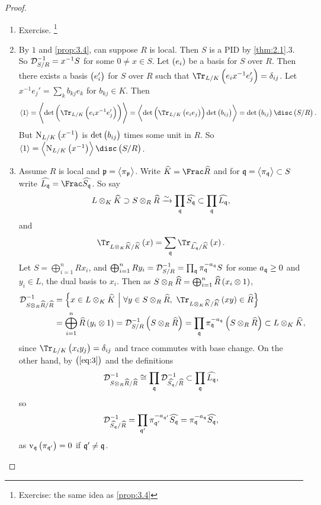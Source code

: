 \begin{proof}
\hfill
\begin{enumerate}
\item Exercise. \footnote{Exercise: the same idea as \ref{prop:3.4}}
\item By $ 1 $ and \ref{prop:3.4}, can suppose $ R $ is local. Then $ S $ is a PID by \ref{thm:2.1}.$ 3 $. So $ \mathcal{D}_{S / R}^{-1} = x^{-1}S $ for some $ 0 \ne x \in S $. Let $ \br{e_i} $ be a basis for $ S $ over $ R $. Then there exists a basis $ \br{e_i'} $ for $ S $ over $ R $ such that $ \Tr_{L / K}\br{e_ix^{-1}e_j'} = \delta_{ij} $. Let $ x^{-1}e_j' = \sum_k b_{kj}e_k $ for $ b_{kj} \in K $. Then
$$ \abr{1} = \abr{\det \br{\Tr_{L / K}\br{e_ix^{-1}e_j'}}} = \abr{\det \br{\Tr_{L / K}\br{e_ie_j}}\det \br{b_{ij}}} = \det \br{b_{ij}}\disc\br{S / R}. $$
But $ \N_{L / K}\br{x^{-1}} $ is $ \det \br{b_{ij}} $ times some unit in $ R $. So $ \abr{1} = \abr{\N_{L / K}\br{x^{-1}}}\disc\br{S / R} $.


\item Assume $ R $ is local and $ \mathfrak{p} = \left\langle \pi_{\mathfrak{p}} \right\rangle $. Write $ \widehat{K} = \Frac \widehat{R} $ and for $ \mathfrak{q} = \left\langle \pi_{\mathfrak{q}} \right\rangle \subset S $ write $ \widehat{L_\qqq} = \Frac \widehat{S_\qqq} $. So say
$$ L \otimes_K \widehat{K} \supset S \otimes_R \widehat{R} \xrightarrow{\sim} \prod_{\mathfrak{q}} \widehat{S_{\mathfrak{q}}} \subset \prod_{\mathfrak{q}} \widehat{L_{\mathfrak{q}}}, $$
and
\begin{equation}
\label{eq:3}
\Tr_{L \otimes_K \widehat{K} / \widehat{K}}\br{x} = \sum_\qqq \Tr_{\widehat{L_\qqq} / \widehat{K}}\br{x}.
\end{equation}
Let $ S = \bigoplus_{i = 1}^n Rx_i $, and $ \bigoplus_{i = 1}^n Ry_i = \mathcal{D}_{S / R}^{-1} = \prod_{\mathfrak{q}} \pi_{\mathfrak{q}}^{-a_{\mathfrak{q}}}S $ for some $ a_{\mathfrak{q}} \ge 0 $ and $ y_i \in L $, the dual basis to $ x_i $. Then as $ S \otimes_R \widehat{R} = \bigoplus_{i = 1}^n \widehat{R}\br{x_i \otimes 1} $,
\begin{align*}
\DDD_{S \otimes_R \widehat{R} / \widehat{R}}^{-1}
& = \cbr{x \in L \otimes_K \widehat{K} \st \forall y \in S \otimes_R \widehat{R}, \ \Tr_{L \otimes_K \widehat{K} / \widehat{K}}\br{xy} \in \widehat{R}} \\
& = \bigoplus_{i = 1}^n \widehat{R}\br{y_i \otimes 1}
= \DDD_{S / R}^{-1}\br{S \otimes_R \widehat{R}}
= \prod_\qqq \pi_\qqq^{-a_\qqq}\br{S \otimes_R \widehat{R}}
\subset L \otimes_K \widehat{K},
\end{align*}
since $ \Tr_{L / K}\br{x_iy_j} = \delta_{ij} $ and trace commutes with base change. On the other hand, by $ \br{\ref{eq:3}} $ and the definitions
$$ \mathcal{D}_{S \otimes_R \widehat{R} / \widehat{R}}^{-1} \cong \prod_{\mathfrak{q}} \mathcal{D}_{\widehat{S_{\mathfrak{q}}} / \widehat{R}}^{-1} \subset \prod_{\mathfrak{q}} \widehat{L_{\mathfrak{q}}}, $$
so
$$ \mathcal{D}_{\widehat{S_{\mathfrak{q}}} / \widehat{R}}^{-1} = \prod_{\mathfrak{q}'} \pi_{\mathfrak{q}'}^{-a_{\mathfrak{q}'}}\widehat{S_{\mathfrak{q}}} = \pi_{\mathfrak{q}}^{-a_{\mathfrak{q}}}\widehat{S_{\mathfrak{q}}}, $$
as $ \v_\qqq\br{\pi_{\qqq'}} = 0 $ if $ \mathfrak{q}' \ne \mathfrak{q} $.
\end{enumerate}
\end{proof}

